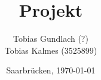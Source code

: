 \begin{titlepage}

	\titlehead
	{
		\texttt{[image: images/logos/HTW]}		
		\hfill		
	}
	
	\subject
	{
		\Huge Dokumentation\\
		\normalsize Mobile Computing\\
	}
	
	\title
	{
		Projekt
	}
	
	\author
	{	
		Tobias Gundlach (?)\\
		Tobias Kalmes (3525899)
	}
	
	\date
	{
		\normalsize{Saarbrücken, \today}
	}	
	\maketitle	
\end{titlepage}
